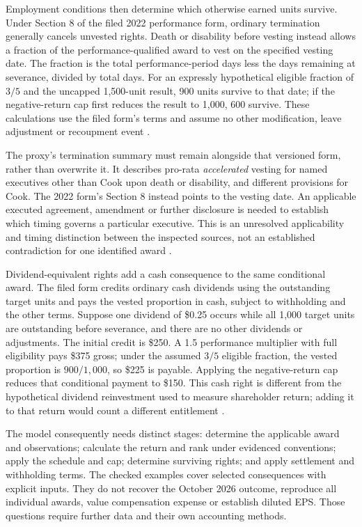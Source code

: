 Employment conditions then determine which otherwise earned units survive.
Under Section 8 of the filed 2022 performance form, ordinary termination
generally cancels unvested rights. Death or disability before vesting instead
allows a fraction of the performance-qualified award to vest on the specified
vesting date. The fraction is the total performance-period days less the days
remaining at severance, divided by total days. For an expressly hypothetical
eligible fraction of $3/5$ and the uncapped 1,500-unit result, 900 units survive
to that date; if the negative-return cap first reduces the result to 1,000,
600 survive. These calculations use the filed form's terms and assume no
other modification, leave adjustment or recoupment event
\citep[Exhibit 10.3, Sections 3--4 and 7--9]{apple2022plan}.

The proxy's termination summary must remain alongside that versioned form,
rather than overwrite it. It describes pro-rata \emph{accelerated} vesting for
named executives other than Cook upon death or disability, and different
provisions for Cook. The 2022 form's Section 8 instead points to the vesting
date. An applicable executed agreement, amendment or further disclosure is
needed to establish which timing governs a particular executive. This is an
unresolved applicability and timing distinction between the inspected sources,
not an established contradiction for one identified award
\citep[printed p.~53]{apple2025proxy}.

Dividend-equivalent rights add a cash consequence to the same conditional
award. The filed form credits ordinary cash dividends using the outstanding
target units and pays the vested proportion in cash, subject to withholding
and the other terms. Suppose one dividend of \$0.25 occurs while all 1,000
target units are outstanding before severance, and there are no other
dividends or adjustments. The initial credit is \$250. A 1.5 performance
multiplier with full eligibility pays \$375 gross; under the assumed $3/5$
eligible fraction, the vested proportion is $900/1{,}000$, so \$225 is payable.
Applying the negative-return cap reduces that conditional payment to \$150.
This cash right is different from the hypothetical dividend reinvestment used
to measure shareholder return; adding it to that return would count a
different entitlement \citep[Exhibit 10.3, Section 5(b)]{apple2022plan}.

The model consequently needs distinct stages: determine the applicable award
and observations; calculate the return and rank under evidenced conventions;
apply the schedule and cap; determine surviving rights; and apply settlement
and withholding terms. The checked examples cover selected consequences with
explicit inputs. They do not recover the October 2026 outcome, reproduce all
individual awards, value compensation expense or establish diluted EPS. Those
questions require further data and their own accounting methods.
